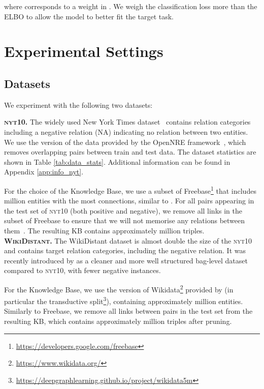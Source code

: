 \documentclass[11pt]{article}
\begin{document}
where  corresponds to a weight in . We weigh the classification loss more than the ELBO to allow the model to better fit the target task.



\section{Experimental Settings}

\subsection{Datasets}
We experiment with the following two datasets:

\noindent \textbf{\textsc{nyt10}.} The widely used New York Times dataset~\citep{riedel2010modeling} contains  relation categories including a negative relation (NA) indicating no relation between two entities.
We use the version of the data provided by the OpenNRE framework~\citep{han2019opennre}, which removes overlapping pairs between train and test data.
The dataset statistics are shown in Table \ref{tab:data_stats}. Additional information can be found in Appendix \ref{app:info_nyt}.

For the choice of the Knowledge Base, we use a subset of Freebase\footnote{\url{https://developers.google.com/freebase}} that includes  million entities with the most connections, similar to \citet{xu2019hrere}. For all pairs appearing in the test set of \textsc{nyt10} (both positive and negative), we remove all links in the subset of Freebase to ensure that we will not memorise any relations between them~\citep{weston2013connecting}. The resulting KB contains approximately  million triples. \\


\noindent \textbf{\textsc{WikiDistant}.} The WikiDistant dataset is almost double the size of the \textsc{nyt10} and contains  target relation categories, including the negative relation. It was recently introduced by \citet{han2020more} as a cleaner and more well structured bag-level dataset compared to \textsc{nyt10}, with fewer negative instances.

For the Knowledge Base, we use the version of Wikidata\footnote{\url{https://www.wikidata.org/}} provided by \citet{wang2019kepler} (in particular the transductive split\footnote{\url{https://deepgraphlearning.github.io/project/wikidata5m}}), containing approximately  million entities. Similarly to Freebase, we remove all links between pairs in the test set from the resulting KB, which contains approximately  million triples after pruning.
\end{document}
